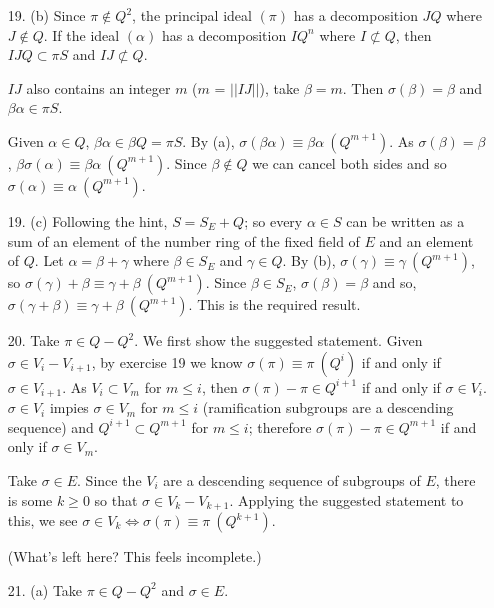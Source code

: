 \documentclass{article}
\newcommand{\modequiv}[3]{#1 \equiv #2\ (#3)}
\begin{document}
\begin{enumerate}
\item[19. (b)] Since $\pi \not\in Q^2$, the principal ideal $(\pi)$ has a decomposition $JQ$ where $J \not \in Q$.  If the ideal $(\alpha)$ has a decomposition $IQ^{n}$ where $I \not\subset Q$, then $IJQ \subset \pi S$ and $IJ \not\subset Q$.

$IJ$ also contains an integer $m$ ($m$ = $||IJ||$), take $\beta = m$.  Then $\sigma(\beta) = \beta$ and $\beta \alpha \in \pi S$.

Given $\alpha \in Q$, $\beta \alpha \in \beta Q = \pi S$.  By (a), $\modequiv{\sigma(\beta \alpha)}{\beta \alpha}{Q^{m + 1}}$.  As $\sigma(\beta) = \beta$, $\modequiv{\beta\sigma(\alpha)}{\beta \alpha}{Q^{m+1}}$.  Since $\beta \not\in Q$ we can cancel both sides and so $\modequiv{\sigma(\alpha)}{\alpha}{Q^{m+1}}$.

\item[19. (c)] Following the hint, $S = S_{E} + Q$; so every $\alpha \in S$ can be written as a sum of an element of the number ring of the fixed field of $E$ and an element of $Q$.  Let $\alpha = \beta + \gamma$ where $\beta \in S_{E}$ and $\gamma \in Q$.  By (b), $\modequiv{\sigma(\gamma)}{\gamma}{Q^{m+1}}$, so $\modequiv{\sigma(\gamma) + \beta}{\gamma + \beta}{Q^{m+1}}$.  Since $\beta \in S_{E}$, $\sigma(\beta) = \beta$ and so, $\modequiv{\sigma(\gamma + \beta)}{\gamma + \beta}{Q^{m+1}}$.  This is the required result.

\item[20.]  Take $\pi \in Q - Q^2$.  We first show the suggested statement.  Given $\sigma \in V_{i} - V_{i+1}$, by exercise 19 we know $\modequiv{\sigma(\pi)}{\pi}{Q^{i}}$ if and only if $\sigma \in V_{i + 1}$.  As $V_{i} \subset V_{m}$ for $m \leq i$, then $\sigma(\pi)- \pi \in Q^{i + 1}$ if and only if $\sigma \in V_{i}$.  $\sigma \in V_{i}$ impies $\sigma \in V_m$ for $m \leq i$ (ramification subgroups are a descending sequence) and $Q^{i+1} \subset Q^{m + 1}$ for $m \leq i$; therefore $\sigma(\pi) - \pi \in Q^{m + 1}$ if and only if $\sigma \in V_{m}$.

Take $\sigma \in E$.  Since the $V_i$ are a descending sequence of subgroups of $E$, there is some $k \geq 0$ so that $\sigma \in V_{k} - V_{k+1}$.  Applying the suggested statement to this, we see $\sigma \in V_{k} \iff \modequiv{\sigma(\pi)}{\pi}{Q^{k+1}}$.

(What's left here?  This feels incomplete.)

\item[21. (a)] Take $\pi \in Q - Q^2$ and $\sigma \in E$.


\end{enumerate}
\end{document}
